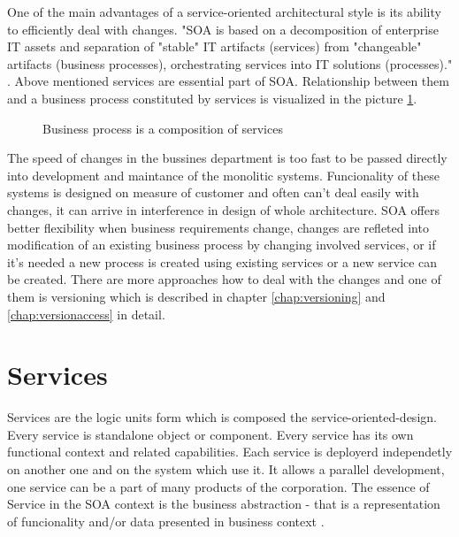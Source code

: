 One of the main advantages of a service-oriented architectural style is its ability to efficiently deal with changes. "SOA is based on a decomposition of enterprise IT assets and separation of "stable" IT artifacts (services) from "changeable" artifacts (business processes), orchestrating services into IT solutions (processes)." \cite{website:versioning-in-soa}. %
Above mentioned services are essential part of SOA. Relationship between them and a business process constituted by services is visualized in the picture \ref{fig:business-process-services}.

\begin{figure}[htp] 
\caption{Business process is a composition of services}
\label{fig:business-process-services}
\end{figure} 

The speed of changes in the bussines department is too fast to be passed directly into development and maintance of the monolitic systems. Funcionality of these systems is designed on measure of customer and often can't deal easily with changes, it can arrive in interference in design of whole architecture. SOA offers better flexibility when business requirements change, changes are refleted into modification of an existing business process by changing involved services, or if it's needed a new process is created using existing services or a new service can be created. There are more approaches how to deal with the changes and one of them is versioning which is described in chapter \ref{chap:versioning} and \ref{chap:versionaccess} in detail.





\section{Services}
\label{sec:services}
Services are the logic units form which is composed the \gls{service-oriented-design}. Every service is standalone object or component. Every service has its own functional context and related capabilities. Each service is deployerd independetly on another one and on the system which use it. It allows a parallel development, one service can be a part of many products of the corporation.
The essence of Service in the SOA context is the business abstraction - that is a representation of funcionality and/or data presented in business context \cite{agile-architecture}.

